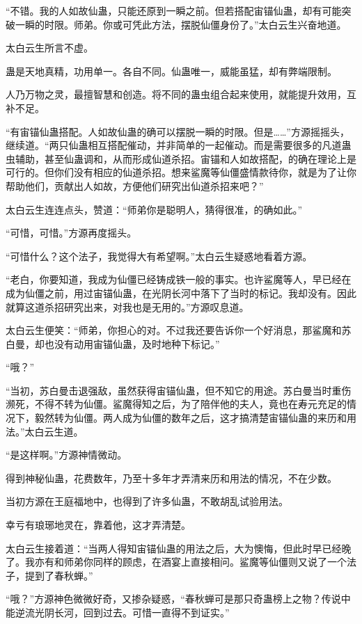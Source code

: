 \begin{this_body}
“不错。我的人如故仙蛊，只能还原到一瞬之前。但若搭配宙锚仙蛊，却有可能突破一瞬的时限。师弟。你或可凭此方法，摆脱仙僵身份了。”太白云生兴奋地道。

太白云生所言不虚。

蛊是天地真精，功用单一。各自不同。仙蛊唯一，威能虽猛，却有弊端限制。

人乃万物之灵，最擅智慧和创造。将不同的蛊虫组合起来使用，就能提升效用，互补不足。

“有宙锚仙蛊搭配。人如故仙蛊的确可以摆脱一瞬的时限。但是……”方源摇摇头，继续道。“两只仙蛊相互搭配催动，并非简单的一起催动。而是需要很多的凡道蛊虫辅助，甚至仙蛊调和，从而形成仙道杀招。宙锚和人如故搭配，的确在理论上是可行的。但你们没有相应的仙道杀招。想来鲨魔等仙僵盛情款待你，就是为了让你帮助他们，贡献出人如故，方便他们研究出仙道杀招来吧？”

太白云生连连点头，赞道：“师弟你是聪明人，猜得很准，的确如此。”

“可惜，可惜。”方源再度摇头。

“可惜什么？这个法子，我觉得大有希望啊。”太白云生疑惑地看着方源。

“老白，你要知道，我成为仙僵已经铸成铁一般的事实。也许鲨魔等人，早已经在成为仙僵之前，用过宙锚仙蛊，在光阴长河中落下了当时的标记。我却没有。因此就算这道杀招研究出来，对我也是无用的。”方源叹息道。

太白云生便笑：“师弟，你担心的对。不过我还要告诉你一个好消息，那鲨魔和苏白曼，却也没有动用宙锚仙蛊，及时地种下标记。”

“哦？”

“当初，苏白曼击退强敌，虽然获得宙锚仙蛊，但不知它的用途。苏白曼当时重伤濒死，不得不转为仙僵。鲨魔得知之后，为了陪伴他的夫人，竟也在寿元充足的情况下，毅然转为仙僵。两人成为仙僵的数年之后，这才搞清楚宙锚仙蛊的来历和用法。”太白云生道。

“是这样啊。”方源神情微动。

得到神秘仙蛊，花费数年，乃至十多年才弄清来历和用法的情况，不在少数。

当初方源在王庭福地中，也得到了许多仙蛊，不敢胡乱试验用法。

幸亏有琅琊地灵在，靠着他，这才弄清楚。

太白云生接着道：“当两人得知宙锚仙蛊的用法之后，大为懊悔，但此时早已经晚了。我亦有和师弟你同样的顾虑，在酒宴上直接相问。鲨魔等仙僵则又说了一个法子，提到了春秋蝉。”

“哦？”方源神色微微好奇，又掺杂疑惑，“春秋蝉可是那只奇蛊榜上之物？传说中能逆流光阴长河，回到过去。可惜一直得不到证实。”


\end{this_body}
